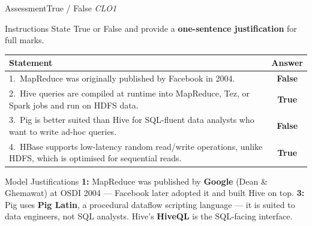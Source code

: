 \documentclass[aspectratio=169,10pt]{beamer}
\begin{document}
\begin{frame}{Assessment\textemdash True / False \hfill\small\textit{CLO1}}
  \begin{block}{Instructions}
    State True or False and provide a \textbf{one-sentence justification} for full marks.
  \end{block}
  \vspace{6pt}
  \centering
  \renewcommand{\arraystretch}{1.6}
  \begin{tabular}{p{9.0cm}c}
    \toprule
    \textbf{Statement} & \textbf{Answer} \\
    \midrule
    1.\ MapReduce was originally published by Facebook in 2004. &
    \alert{\textbf{False}} \\
    2.\ Hive queries are compiled at runtime into MapReduce, Tez, or Spark jobs and run on HDFS data. &
    \textbf{True} \\
    3.\ Pig is better suited than Hive for SQL-fluent data analysts who want to write ad-hoc queries. &
    \alert{\textbf{False}} \\
    4.\ HBase supports low-latency random read/write operations, unlike HDFS, which is optimised for sequential reads. &
    \textbf{True} \\
    \bottomrule
  \end{tabular}
  \vspace{6pt}
  \begin{exampleblock}{Model Justifications}
    \small \textbf{1:} MapReduce was published by \textbf{Google} (Dean \& Ghemawat) at OSDI 2004 — Facebook later adopted it and built Hive on top.  \textbf{3:} Pig uses \textbf{Pig Latin}, a procedural dataflow scripting language — it is suited to data engineers, not SQL analysts.  Hive's \textbf{HiveQL} is the SQL-facing interface.
  \end{exampleblock}
\end{frame}
\end{document}
